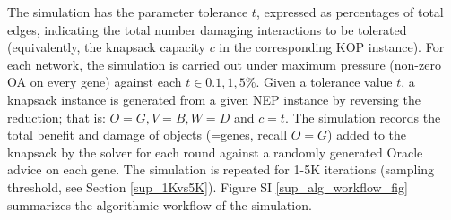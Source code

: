 			The simulation has the parameter tolerance $t$, expressed as percentages of total edges,  indicating the total number damaging interactions to
			be tolerated (equivalently, the knapsack capacity $c$ in the
			corresponding KOP instance).
			For each network, the simulation is carried out under maximum pressure (non-zero OA on every gene)
			against each $t \in {0.1, 1, 5}\%$.
			Given a tolerance value $t$, a knapsack instance is generated from a given NEP instance by reversing the reduction;
			that is: $O=G, V=B, W=D$ and $c=t$. The simulation records the total benefit and damage of objects (=genes, recall $O=G$)
			added to the knapsack by the solver  \cite{pisinger_where_2005} for each round against a randomly generated Oracle advice on each gene.
			The simulation is repeated for 1-5K iterations (sampling threshold, see Section \ref{sup_1Kvs5K}). Figure SI \ref{sup_alg_workflow_fig} summarizes the algorithmic workflow of the simulation.



